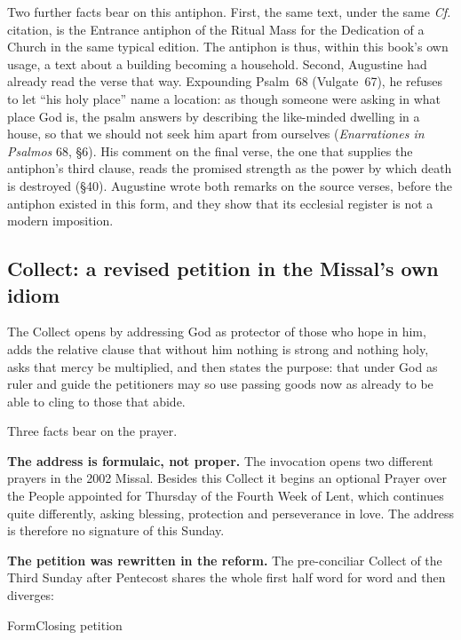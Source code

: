 Two further facts bear on this antiphon. First, the same text, under the same \emph{Cf.} citation, is the Entrance antiphon of the Ritual Mass for the Dedication of a Church in the same typical edition. The antiphon is thus, within this book's own usage, a text about a building becoming a household. Second, Augustine had already read the verse that way. Expounding Psalm~68 (Vulgate~67), he refuses to let ``his holy place'' name a location: as though someone were asking in what place God is, the psalm answers by describing the like-minded dwelling in a house, so that we should not seek him apart from ourselves (\emph{Enarrationes in Psalmos} 68, §6). His comment on the final verse, the one that supplies the antiphon's third clause, reads the promised strength as the power by which death is destroyed (§40). Augustine wrote both remarks on the source verses, before the antiphon existed in this form, and they show that its ecclesial register is not a modern imposition.

\subsection*{Collect: a revised petition in the Missal's own idiom}

The Collect opens by addressing God as protector of those who hope in him, adds the relative clause that without him nothing is strong and nothing holy, asks that mercy be multiplied, and then states the purpose: that under God as ruler and guide the petitioners may so use passing goods now as already to be able to cling to those that abide.

Three facts bear on the prayer.

\textbf{The address is formulaic, not proper.} The invocation  opens two different prayers in the 2002 Missal. Besides this Collect it begins an optional Prayer over the People appointed for Thursday of the Fourth Week of Lent, which continues quite differently, asking blessing, protection and perseverance in love. The address is therefore no signature of this Sunday.

\textbf{The petition was rewritten in the reform.} The pre-conciliar Collect of the Third Sunday after Pentecost shares the whole first half word for word and then diverges:

\begin{twocoltable}{Form}{Closing petition}
\end{twocoltable}


